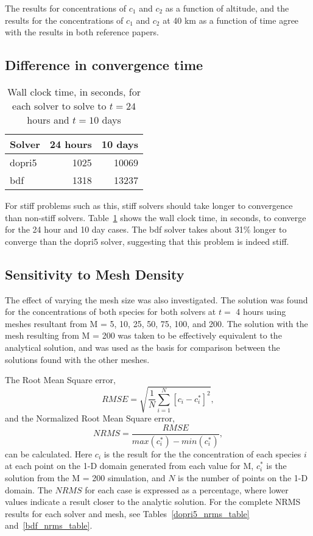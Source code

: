 \documentclass[twocolumn,10pt]{asme2ej}
\begin{document}
The results for concentrations of $c_1$ and $c_2$ as a function of altitude, and the results for the concentrations of $c_1$ and $c_2$ at 40 km as a function of time agree with the results in both reference papers.

\subsection{Difference in convergence time}
\begin{table}[tb]
\begin{center}
\begin{tabular}{| l | r r |}
\hline
Solver & 24 hours & 10 days \\
\hline
dopri5 & 1025     & 10069   \\
bdf    & 1318     & 13237   \\
\hline
\end{tabular}
\caption{Wall clock time, in seconds, for each solver to solve to $t=24$ hours and $t=10$ days}
\label{run_time}
\end{center}
\end{table}

For stiff problems such as this, stiff solvers should take longer to convergence than non-stiff solvers. Table~\ref{run_time} shows the wall clock time, in seconds, to converge for the 24 hour and 10 day cases. The bdf solver takes about 31\% longer to converge than the dopri5 solver, suggesting that this problem is indeed stiff.

\subsection{Sensitivity to Mesh Density}

The effect of varying the mesh size was also investigated. The solution was found for the concentrations of both species for both solvers at $t = $ 4 hours using meshes resultant from M = 5, 10, 25, 50, 75, 100, and 200. The solution with the mesh resulting from M = 200 was taken to be effectively equivalent to the analytical solution, and was used as the basis for comparison between the solutions found with the other meshes.

The Root Mean Square error,
\begin{equation}
RMSE = \sqrt{\frac{1}{N}\sum\limits_{i=1}^N[c_i - c^*_i]^2},
\end{equation}
and the Normalized Root Mean Square error,
\begin{equation}
NRMS = \dfrac{RMSE}{max(c^*_i)-min(c^*_i)},
\end{equation}
can be calculated. Here $c_i$ is the result for the the concentration of each species $i$ at each point on the 1-D domain generated from each value for M, $c^*_i$ is the solution from the M = 200 simulation, and $N$ is the number of points on the 1-D domain. The $NRMS$ for each case is expressed as a percentage, where lower values indicate a result closer to the analytic solution. For the complete NRMS results for each solver and mesh, see Tables~\ref{dopri5_nrms_table} and~\ref{bdf_nrms_table}.
\end{document}
